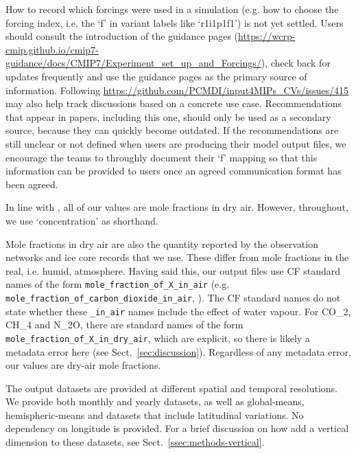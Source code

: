 How to record which forcings were used in a simulation
(e.g. how to choose the forcing index, i.e. the `f' in variant labels like `r1i1p1f1')
is not yet settled.
Users should consult the introduction of the guidance pages \newline
(\mbox{\url{https://wcrp-cmip.github.io/cmip7-guidance/docs/CMIP7/Experiment_set_up_and_Forcings/}}),
check back for updates frequently and use the guidance pages as the primary source of information.
Following \newline \mbox{\url{https://github.com/PCMDI/input4MIPs_CVs/issues/415}}
may also help track discussions based on a concrete use case.
Recommendations that appear in papers, including this one,
should only be used as a secondary source, because they can quickly become outdated.
If the recommendations are still unclear or not defined when users are producing their model output files,
we encourage the teams to throughly document their `f' mapping so that this information
can be provided to users once an agreed communication format has been agreed.

In line with \citet{meinshausen_historical-ghgs_2017},
all of our values are mole fractions in dry air.
However, throughout, we use `concentration' as shorthand.

Mole fractions in dry air are also the quantity reported by the observation networks and ice core records that we use.
These differ from mole fractions in the real, i.e. humid, atmosphere.
Having said this, our output files use CF standard names of the form \texttt{mole\_fraction\_of\_X\_in\_air}
(e.g. \texttt{mole\_fraction\_of\_carbon\_dioxide\_in\_air}, \citealp{eaton_cf-conventions_2026}).
The CF standard names do not state whether these \texttt{\_in\_air} names include the effect of water vapour.
For CO_2, CH_4 and N_2O, there are standard names of the form \texttt{mole\_fraction\_of\_X\_in\_dry\_air},
which are explicit, so there is likely a metadata error here (see Sect.~\ref{sec:discussion}).
Regardless of any metadata error, our values are dry-air mole fractions.

The output datasets are provided at different spatial and temporal resolutions.
We provide both monthly and yearly datasets,
as well as global-means, hemispheric-means and datasets that include latitudinal variations.
No dependency on longitude is provided.
For a brief discussion on how add a vertical dimension to these datasets, see Sect.~\ref{ssec:methods-vertical}.

